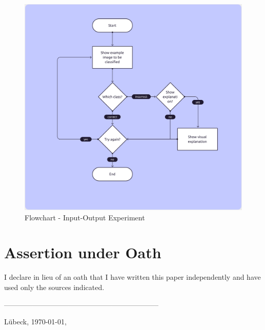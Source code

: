 \begin{figure}[htbp]
    \centering
    \includegraphics[width=\textwidth]{img/figures/flowcharts/experiment.png}
    \caption{Flowchart - Input-Output Experiment}
    \label{figure:flowchart_experiment}
\end{figure}

\clearpage

{}
\chapter*{Assertion under Oath}
I declare in lieu of an oath that I have written this paper independently and have used only the sources indicated.

-----------------------------------------------------------------

Lübeck, \today, \authorMA